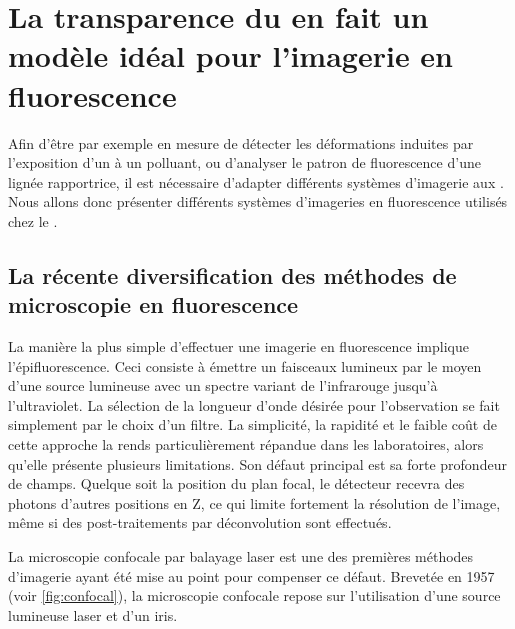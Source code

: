 \documentclass[\main/main.tex]{subfiles}
\begin{document}
            
\section{La transparence du \pz{} en fait un modèle idéal pour l'imagerie en fluorescence}

\label{sec:imagerie}

Afin d'être par exemple en mesure de détecter les déformations induites par l'exposition d'un \pz{} à un polluant,
ou d'analyser le patron de fluorescence d'une lignée rapportrice,
il est nécessaire d'adapter différents systèmes d'imagerie aux \pz{}.
%
Nous allons donc présenter différents systèmes d'imageries en fluorescence utilisés chez le \pz{}.

    \subsection{La récente diversification des méthodes de microscopie en fluorescence}
    
La manière la plus simple d'effectuer une imagerie en fluorescence implique l'épifluorescence.
Ceci consiste à émettre un faisceaux lumineux par le moyen d'une source lumineuse avec un spectre variant de l'infrarouge jusqu'à l'ultraviolet.
%
La sélection de la longueur d'onde désirée pour l'observation se fait simplement par le choix d'un filtre.
%
La simplicité, la rapidité et le faible coût de cette approche la rends particulièrement répandue dans les laboratoires, alors qu'elle présente plusieurs limitations.
%
Son défaut principal est sa forte profondeur de champs.
%
Quelque soit la position du plan focal, le détecteur recevra des photons d'autres positions en Z, ce qui limite fortement la résolution de l'image, même si des post-traitements par déconvolution sont effectués.


%
La microscopie confocale par balayage laser est une des premières méthodes d'imagerie ayant été mise au point pour compenser ce défaut. 
%
Brevetée en 1957 (voir \autoref{fig:confocal}), la microscopie confocale repose sur l'utilisation d'une source lumineuse laser et d'un iris.
\end{document}
